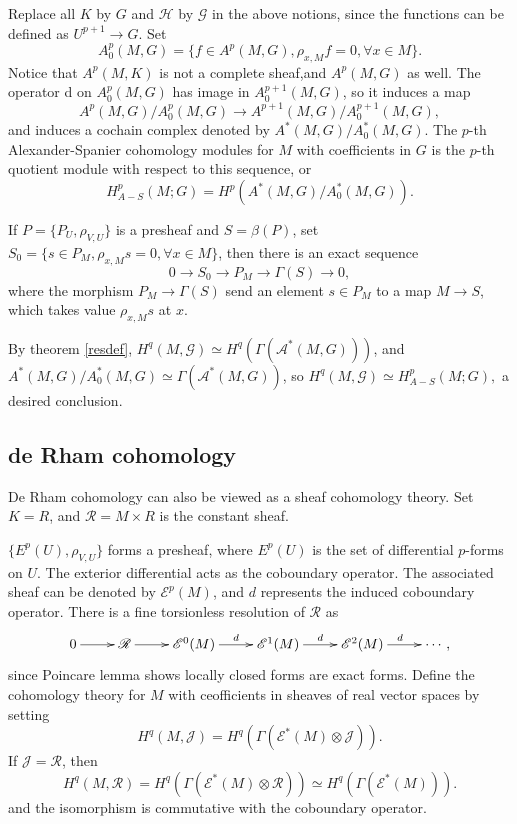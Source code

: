 \documentclass[twoside]{article}
\begin{document}
 Replace all $K$ by $G$ and $\mathscr{H}$ by $\mathscr{G}$ in the above notions, since the functions can be defined as $U^{p+1}\to G$. Set $$A_0^p(M,G)=\{f\in A^p(M,G),\rho_{x,M}f=0,\forall x\in M\}.$$
 Notice that  $A^p(M,K)$ is not a complete sheaf,and  $A^p(M,G)$ as well. The operator d on $A_0^p(M,G)$ has image in $A_0^{p+1}(M,G)$, so it induces a map $$
 A^p(M,G)/A_0^p(M,G)\to A^{p+1}(M,G)/A_0^{p+1}(M,G),
 $$
and induces a cochain complex denoted by $A^*(M,G)/A_0^*(M,G)$. The $p$-th Alexander-Spanier cohomology modules for $M$ with coefficients in $G$ is the $p$-th quotient module with respect to this sequence, or
$$
H_{A-S}^p(M;G)=H^p(A^*(M,G)/A_0^*(M,G)).
$$
\begin{lemma}
  If $P=\{P_U,\rho_{V,U}\}$ is a presheaf and $S=\beta(P)$, set $S_0=\{s\in P_M,\rho_{x,M}s=0,\forall x\in M\}$, then there is an exact sequence $$
  0\to S_0\to P_M\to \Gamma(S)\to 0,
  $$
  where the morphism $P_M\to \Gamma(S)$ send an element $s\in P_M$ to a map $M\to S$, which takes value $\rho_{x,M}s$ at $x$.
\end{lemma}

By theorem \ref{resdef}, $H^q(M,\mathscr{G})\simeq H^q(\Gamma(\mathscr{A}^*(M,G)))$, and $A^*(M,G)/A_0^*(M,G)\simeq \Gamma(\mathscr{A}^*(M,G))$, so $H^q(M,\mathscr{G})\simeq H_{A-S}^p(M;G),$ a desired conclusion.

\subsection{de Rham cohomology}
De Rham cohomology can also be viewed  as a sheaf cohomology theory. Set $K=R$, and $\mathscr{R}=M\times R$ is  the constant sheaf.

$\{E^p(U),\rho_{V,U}\}$ forms a presheaf, where $E^p(U)$ is the set of differential $p$-forms on $U$. The exterior differential acts as the coboundary operator. The associated sheaf can be denoted by $\mathscr{E}^p(M)$, and $d$ represents the induced coboundary operator. There is a fine torsionless resolution of $\mathscr{R}$ as \begin{equation*}
  \xymatrix{
  0\ar[r]&\mathscr{R}\ar[r]&\mathscr{E}^0(M)\ar[r]^d&\mathscr{E}^1(M)\ar[r]^d&\mathscr{E}^2(M)\ar[r]^d&\cdots,
  }
\end{equation*}
 since Poincare lemma shows locally closed forms are exact forms. Define the cohomology theory for $M$ with ceofficients in sheaves of real vector spaces by setting $$
 H^q(M,\mathscr{J})=H^q(\Gamma(\mathscr{E}^*(M)\otimes \mathscr{J})).
 $$
If $\mathscr{J}=\mathscr{R}$, then $$
 H^q(M,\mathscr{R})=H^q(\Gamma(\mathscr{E}^*(M)\otimes \mathscr{R}))\simeq H^q(\Gamma(\mathscr{E}^*(M))).
 $$
 and the isomorphism is commutative with the coboundary operator.
\end{document}
